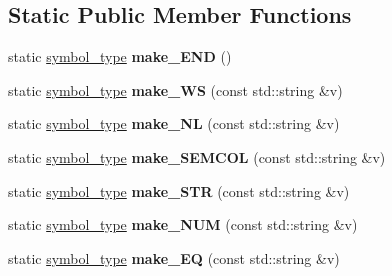 \subsection*{Static Public Member Functions}
\begin{DoxyCompactItemize}
\item 
\hypertarget{classyy_1_1parser_a81e92308791a1bb5818a69350c57eb64}{}static \hyperlink{classyy_1_1parser_aa8024edbba983aa5cd3e88c3a4dcacc9}{symbol\+\_\+type} {\bfseries make\+\_\+\+E\+N\+D} ()\label{classyy_1_1parser_a81e92308791a1bb5818a69350c57eb64}

\item 
\hypertarget{classyy_1_1parser_a55a4c5d45240f82b77369fa3b571dae2}{}static \hyperlink{classyy_1_1parser_aa8024edbba983aa5cd3e88c3a4dcacc9}{symbol\+\_\+type} {\bfseries make\+\_\+\+W\+S} (const std\+::string \&v)\label{classyy_1_1parser_a55a4c5d45240f82b77369fa3b571dae2}

\item 
\hypertarget{classyy_1_1parser_a00430dd1f2872b195d4f26b55d4dc247}{}static \hyperlink{classyy_1_1parser_aa8024edbba983aa5cd3e88c3a4dcacc9}{symbol\+\_\+type} {\bfseries make\+\_\+\+N\+L} (const std\+::string \&v)\label{classyy_1_1parser_a00430dd1f2872b195d4f26b55d4dc247}

\item 
\hypertarget{classyy_1_1parser_a4f06945a1f3e56b0ef6f1ebce4f56ac3}{}static \hyperlink{classyy_1_1parser_aa8024edbba983aa5cd3e88c3a4dcacc9}{symbol\+\_\+type} {\bfseries make\+\_\+\+S\+E\+M\+C\+O\+L} (const std\+::string \&v)\label{classyy_1_1parser_a4f06945a1f3e56b0ef6f1ebce4f56ac3}

\item 
\hypertarget{classyy_1_1parser_afc27fadcd2040afd65962227c95eb319}{}static \hyperlink{classyy_1_1parser_aa8024edbba983aa5cd3e88c3a4dcacc9}{symbol\+\_\+type} {\bfseries make\+\_\+\+S\+T\+R} (const std\+::string \&v)\label{classyy_1_1parser_afc27fadcd2040afd65962227c95eb319}

\item 
\hypertarget{classyy_1_1parser_a67b23cf5a405a0c77675b466b31757ad}{}static \hyperlink{classyy_1_1parser_aa8024edbba983aa5cd3e88c3a4dcacc9}{symbol\+\_\+type} {\bfseries make\+\_\+\+N\+U\+M} (const std\+::string \&v)\label{classyy_1_1parser_a67b23cf5a405a0c77675b466b31757ad}

\item 
\hypertarget{classyy_1_1parser_ab0e8d64df70680c7a13927b079dc542e}{}static \hyperlink{classyy_1_1parser_aa8024edbba983aa5cd3e88c3a4dcacc9}{symbol\+\_\+type} {\bfseries make\+\_\+\+E\+Q} (const std\+::string \&v)\label{classyy_1_1parser_ab0e8d64df70680c7a13927b079dc542e}


\end{DoxyCompactItemize}
